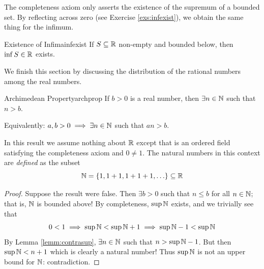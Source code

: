 The completeness axiom only asserts the existence of the supremum of a bounded set. By reflecting across zero (see Exercise \ref{exs:infexist}), we obtain the same thing for the infimum.

\begin{thm}{Existence of Infima}{infexist}
If $S\subseteq\mathbb{R}$ non-empty and bounded below, then $\inf S\in\mathbb{R}$ exists.
\end{thm}

\goodbreak






We finish this section by discussing the distribution of the rational numbers among the real numbers. %

\begin{thm}{Archimedean Property}{archprop}
If $b>0$ is a real number, then $\exists n\in\mathbb{N}$ such that $n>b$.\par
Equivalently:\footnotemark{} $a,b>0\implies \exists n\in\mathbb{N}$ such that $an>b$.
\end{thm}


In this result we assume nothing about $\mathbb{R}$ except that is an ordered field satisfying the completeness axiom and $0\neq 1$. The natural numbers in this context are \emph{defined} as the subset
\[\mathbb{N}=\{1,1+1,1+1+1,\ldots\}\subseteq\mathbb{R}\]

\begin{proof}
Suppose the result were false. Then $\exists b>0$ such that $n\le b$ for all $n\in\mathbb{N}$; that is, $\mathbb{N}$ is bounded above! By completeness, $\sup\mathbb{N}$ exists, and we trivially see that
\[0<1\implies \sup\mathbb{N}<\sup\mathbb{N}+1\implies \sup\mathbb{N}-1<\sup\mathbb{N}\]
By Lemma \ref{lemm:contrasup}, $\exists n\in\mathbb{N}$ such that $n>\sup\mathbb{N}-1$. But then $\sup\mathbb{N}<n+1$ which is clearly a natural number! Thus $\sup\mathbb{N}$ is not an upper bound for $\mathbb{N}$: contradiction.
\end{proof}

